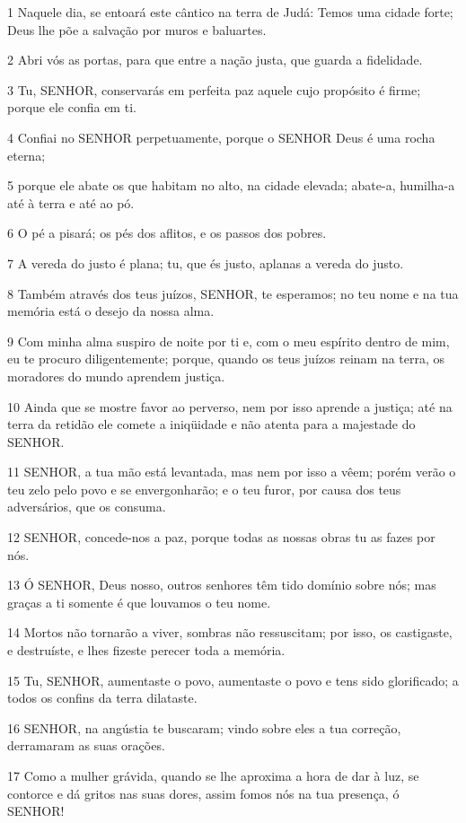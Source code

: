 \par 1 Naquele dia, se entoará este cântico na terra de Judá: Temos uma cidade forte; Deus lhe põe a salvação por muros e baluartes.
\par 2 Abri vós as portas, para que entre a nação justa, que guarda a fidelidade.
\par 3 Tu, SENHOR, conservarás em perfeita paz aquele cujo propósito é firme; porque ele confia em ti.
\par 4 Confiai no SENHOR perpetuamente, porque o SENHOR Deus é uma rocha eterna;
\par 5 porque ele abate os que habitam no alto, na cidade elevada; abate-a, humilha-a até à terra e até ao pó.
\par 6 O pé a pisará; os pés dos aflitos, e os passos dos pobres.
\par 7 A vereda do justo é plana; tu, que és justo, aplanas a vereda do justo.
\par 8 Também através dos teus juízos, SENHOR, te esperamos; no teu nome e na tua memória está o desejo da nossa alma.
\par 9 Com minha alma suspiro de noite por ti e, com o meu espírito dentro de mim, eu te procuro diligentemente; porque, quando os teus juízos reinam na terra, os moradores do mundo aprendem justiça.
\par 10 Ainda que se mostre favor ao perverso, nem por isso aprende a justiça; até na terra da retidão ele comete a iniqüidade e não atenta para a majestade do SENHOR.
\par 11 SENHOR, a tua mão está levantada, mas nem por isso a vêem; porém verão o teu zelo pelo povo e se envergonharão; e o teu furor, por causa dos teus adversários, que os consuma.
\par 12 SENHOR, concede-nos a paz, porque todas as nossas obras tu as fazes por nós.
\par 13 Ó SENHOR, Deus nosso, outros senhores têm tido domínio sobre nós; mas graças a ti somente é que louvamos o teu nome.
\par 14 Mortos não tornarão a viver, sombras não ressuscitam; por isso, os castigaste, e destruíste, e lhes fizeste perecer toda a memória.
\par 15 Tu, SENHOR, aumentaste o povo, aumentaste o povo e tens sido glorificado; a todos os confins da terra dilataste.
\par 16 SENHOR, na angústia te buscaram; vindo sobre eles a tua correção, derramaram as suas orações.
\par 17 Como a mulher grávida, quando se lhe aproxima a hora de dar à luz, se contorce e dá gritos nas suas dores, assim fomos nós na tua presença, ó SENHOR!
